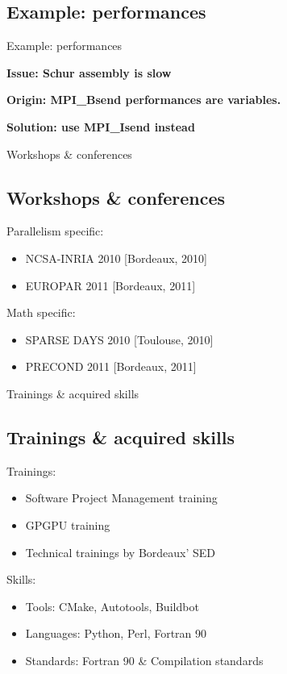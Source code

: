 \documentclass[slideopt,A4]{beamer}
\begin{document}
\subsection{Example: performances}
\begin{frame}{Example: performances}
\centerline{\bf Issue: Schur assembly is slow}
\centerline{\bf Origin: MPI\_Bsend performances are variables.}
\centerline{\bf Solution: use MPI\_Isend instead}
\end{frame}
\begin{frame}{Workshops \& conferences}
\subsection{Workshops \& conferences}
 Parallelism specific:
 \begin{itemize}
   \item NCSA-INRIA 2010 [Bordeaux, 2010]
   \item EUROPAR 2011 [Bordeaux, 2011]
 \end{itemize}

 Math specific:
 \begin{itemize}
   \item SPARSE DAYS 2010 [Toulouse, 2010]
   \item PRECOND 2011 [Bordeaux, 2011]
 \end{itemize}
\end{frame}

\begin{frame}{Trainings \& acquired skills }
\subsection{Trainings \& acquired skills }
 Trainings:
 \begin{itemize}
   \item Software Project Management training
   \item GPGPU training
   \item Technical trainings by Bordeaux' SED
 \end{itemize}

 Skills:
 \begin{itemize}
   \item Tools: CMake, Autotools, Buildbot
   \item Languages: Python, Perl, Fortran 90
   \item Standards: Fortran 90 \& Compilation standards
 \end{itemize}
\end{frame}
\end{document}
